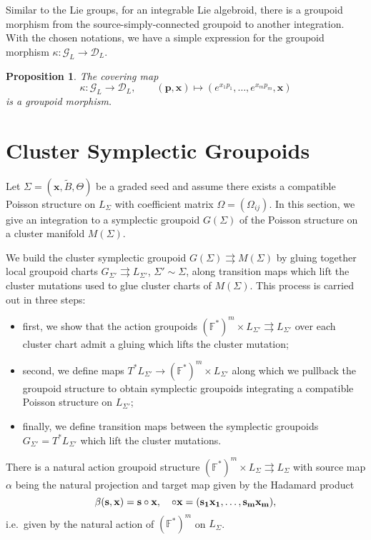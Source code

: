 \documentclass{amsart}
\newtheorem{proposition}[theorem]{Proposition}
\newcommand{\bfp}{\mathbf{p}}
\newcommand{\bfs}{\mathbf{s}}
\newcommand{\bfx}{\mathbf{x}}
\newcommand{\cD}{\mathcal{D}}
\newcommand{\cG}{\mathcal{G}}
\newcommand{\FF}{\mathbb{F}}
\begin{document}
Similar to the Lie groups, for an integrable Lie algebroid, there is a groupoid morphism from the source-simply-connected groupoid to another integration. With the chosen notations, we have a simple expression for the groupoid morphism $\kappa: \cG_L \to \cD_L$.

\begin{proposition}
The covering map
$$
	\kappa: \cG_L \to \cD_L, \qquad (\bfp, \bfx) \mapsto (e^{x_1p_1}, \ldots, e^{x_mp_m}, \bfx)
$$
is a groupoid morphism.
\end{proposition}


\section{Cluster Symplectic Groupoids}
Let $\Sigma=(\bfx,\tilde B,\Theta)$ be a graded seed and assume there exists a compatible Poisson structure on $L_\Sigma$ with coefficient matrix $\Omega=(\Omega_{ij})$.  
In this section, we give an integration to a symplectic groupoid $G(\Sigma)$ of the Poisson structure on a cluster manifold $M(\Sigma)$.  

We build the cluster symplectic groupoid $G(\Sigma)\rightrightarrows M(\Sigma)$ by gluing together local groupoid charts $G_{\Sigma'}\rightrightarrows L_{\Sigma'}$, $\Sigma'\sim\Sigma$, along transition maps which lift the cluster mutations used to glue cluster charts of $M(\Sigma)$.
This process is carried out in three steps:
\begin{itemize}
  \item first, we show that the action groupoids $(\FF^*)^m\times L_{\Sigma'}\rightrightarrows L_{\Sigma'}$ over each cluster chart admit a gluing which lifts the cluster mutation;
  \item second, we define maps $T^*L_{\Sigma'}\to(\FF^*)^m\times L_{\Sigma'}$ along which we pullback the groupoid structure to obtain symplectic groupoids integrating a compatible Poisson structure on $L_{\Sigma'}$;
  \item finally, we define transition maps between the symplectic groupoids $G_{\Sigma'}=T^*L_{\Sigma'}$ which lift the cluster mutations.
\end{itemize}

There is a natural action groupoid structure $(\FF^*)^m\times L_\Sigma\rightrightarrows L_\Sigma$ with source map $\alpha$ being the natural projection and target map given by the Hadamard product
\[\beta(\bfs,\bfx)=\bfs\circ\bfx,\quad \bf\circ\bfx=(s_1x_1,\ldots,s_mx_m),\]
i.e.\ given by the natural action of $(\FF^*)^m$ on $L_\Sigma$.
\end{document}
